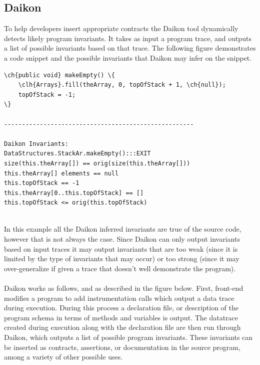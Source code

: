 \documentclass{article}
\newcommand\ch[1]{\textcolor[rgb]{0,0,1}{\textbf{#1}}}
\newcommand\clh[1]{\textcolor[rgb]{0,.5,1}{\textbf{#1}}}
\begin{document}
\subsection{Daikon}
To help developers insert appropriate contracts the Daikon tool \cite{daikon} dynamically detects likely program invariants. It takes as input a program trace, and outputs a list of possible invariants based on that trace.  The following figure demonstrates a code snippet and the possible invariants that Daikon may infer on the snippet.

\begin{center}
\begin{Verbatim}[commandchars=\\\{\}]
\ch{public void} makeEmpty() \{
    \clh{Arrays}.fill(theArray, 0, topOfStack + 1, \ch{null});
    topOfStack = -1;
\}

-----------------------------------------------------

Daikon Invariants:
DataStructures.StackAr.makeEmpty():::EXIT
size(this.theArray[]) == orig(size(this.theArray[]))
this.theArray[] elements == null
this.topOfStack == -1
this.theArray[0..this.topOfStack] == []
this.topOfStack <= orig(this.topOfStack)

\end{Verbatim}
\end{center} 
\  \\
In this example all the Daikon inferred invariants are true of the source code, however that is not always the case. Since Daikon can only output invariants based on input traces it may output invariants that are too weak (since it is limited by the type of invariants that may occur) or too strong (since it may over-generalize if given a trace that doesn't well demonstrate the program).
\\ \\
Daikon works as follows, and as described in the figure below. First, front-end modifies a program to add instrumentation calls which output a data trace during execution. During this process a declaration file, or description of the program schema in terms of methods and variables is output. The datatrace created during execution along with the declaration file are then run through Daikon, which outputs a list of possible program invariants. These invariants can be inserted as contracts, assertions, or documentation in the source program, among a variety of other possible uses.
\end{document}
